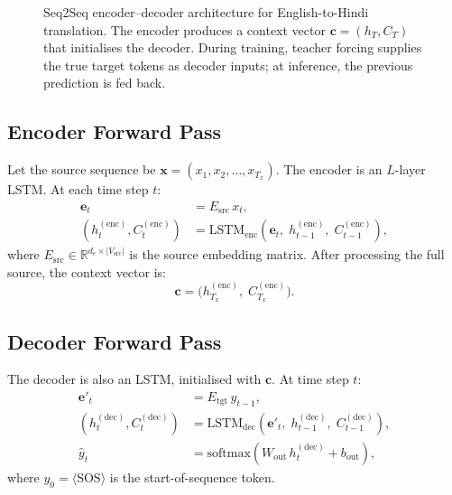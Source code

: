 \documentclass[12pt,a4paper]{article}
\begin{document}
\begin{figure}[htbp]
  \caption{Seq2Seq encoder--decoder architecture for English-to-Hindi translation.
           The encoder produces a context vector $\mathbf{c}=(h_T, C_T)$ that initialises
           the decoder. During training, teacher forcing supplies the true target tokens as
           decoder inputs; at inference, the previous prediction is fed back.}
  \label{fig:enc_dec}
\end{figure}

\subsection{Encoder Forward Pass}

Let the source sequence be $\mathbf{x} = (x_1, x_2, \ldots, x_{T_x})$. The encoder is an
$L$-layer LSTM. At each time step $t$:
\begin{align}
  \mathbf{e}_t &= E_{\text{src}}\,x_t, \label{eq:src_embed}\\
  (h_t^{(\text{enc})}, C_t^{(\text{enc})}) &= \text{LSTM}_{\text{enc}}\!\left(\mathbf{e}_t,\; h_{t-1}^{(\text{enc})},\; C_{t-1}^{(\text{enc})}\right), \label{eq:enc_step}
\end{align}
where $E_{\text{src}} \in \mathbb{R}^{d_e \times |V_{\text{src}}|}$ is the source embedding matrix.
After processing the full source, the context vector is:
\begin{equation}
  \mathbf{c} = \bigl(h_{T_x}^{(\text{enc})},\; C_{T_x}^{(\text{enc})}\bigr).
  \label{eq:context_vec}
\end{equation}

\subsection{Decoder Forward Pass}

The decoder is also an LSTM, initialised with $\mathbf{c}$. At time step $t$:
\begin{align}
  \mathbf{e}'_t &= E_{\text{tgt}}\,y_{t-1}, \label{eq:tgt_embed}\\
  (h_t^{(\text{dec})}, C_t^{(\text{dec})}) &= \text{LSTM}_{\text{dec}}\!\left(\mathbf{e}'_t,\; h_{t-1}^{(\text{dec})},\; C_{t-1}^{(\text{dec})}\right), \label{eq:dec_step}\\
  \hat{y}_t &= \text{softmax}\!\left(W_{\text{out}}\,h_t^{(\text{dec})} + b_{\text{out}}\right), \label{eq:dec_output}
\end{align}
where $y_0 = \langle\text{SOS}\rangle$ is the start-of-sequence token.
\end{document}
